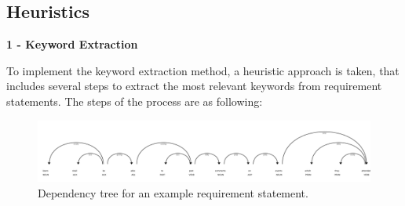 



\subsection{Heuristics}
\label{sec:heuristics}

\textbf{1 - Keyword Extraction}

To implement the keyword extraction method, a heuristic approach is taken, that includes several steps to extract the most relevant keywords from requirement statements. The steps of the process are as following:

\begin{figure}
    \centering
    \includegraphics[width=1\linewidth]{figs/displacy.png}
    \caption{Dependency tree for an example requirement statement.}
    \label{fig:deptree}
\end{figure}

